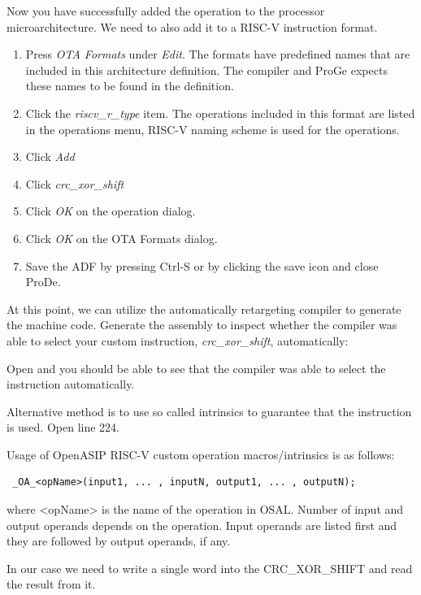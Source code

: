 \documentclass[a4paper,twoside]{tceusermanual}
\begin{document}
Now you have successfully added the operation to the processor
microarchitecture. We need to also add it to a RISC-V instruction
format.

\begin{enumerate}
  \item%
    Press \emph{OTA Formats} under \emph{Edit}.
    The formats have predefined names that are included in this
    architecture definition. The compiler and ProGe expects these names to be 
    found in the definition. 
  \item%
    Click the \emph{riscv\_r\_type} item.
    The operations included in this format are listed in the operations menu,
    RISC-V naming scheme is used for the operations.
  \item%
    Click \emph{Add}
  \item%
    Click \emph{crc\_xor\_shift}
  \item%
    Click \emph{OK} on the operation dialog.
  \item%
    Click \emph{OK} on the OTA Formats dialog.
  \item%
    Save the ADF by pressing Ctrl-S or by clicking the save icon and close ProDe.
\end{enumerate}

At this point, we can utilize the automatically retargeting compiler to generate the machine code.
Generate the assembly to inspect whether the compiler was able to select your custom instruction,
\emph{crc\_xor\_shift}, automatically:


Open  and you should be able to see that the compiler was able to select
the instruction automatically.


Alternative method is to use so called intrinsics to guarantee that the instruction is used.
Open  line 224.

Usage of OpenASIP RISC-V custom operation macros/intrinsics is as follows:

\begin{verbatim}
 _OA_<opName>(input1, ... , inputN, output1, ... , outputN);
\end{verbatim}

where <opName> is the name of the operation in OSAL. Number of input and
output operands depends on the operation. Input operands are listed first
and they are followed by output operands, if any.

In our case we need to write a single word into the CRC\_XOR\_SHIFT and read the
result from it.
\end{document}
